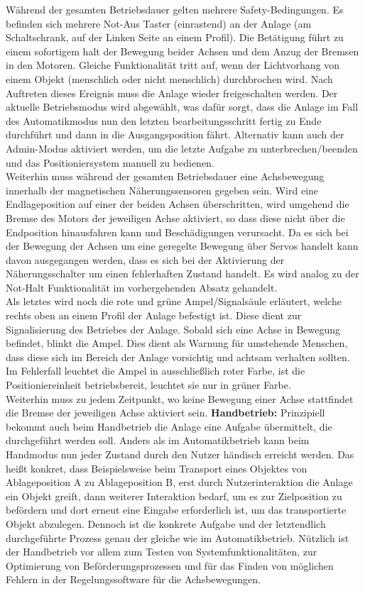\documentclass[../Bachelorarbeit.tex]{subfiles}
\begin{document}
Während der gesamten Betriebsdauer gelten mehrere Safety-Bedingungen. Es befinden sich mehrere Not-Aus Taster (einrastend) an der Anlage (am Schaltschrank, auf der Linken Seite an einem Profil). Die Betätigung führt zu einem sofortigem halt der Bewegung beider Achsen und dem Anzug der Bremsen in den Motoren. Gleiche Funktionalität tritt auf, wenn der Lichtvorhang von einem Objekt (menschlich oder nicht menschlich) durchbrochen wird. Nach Auftreten dieses Ereignis muss die Anlage wieder freigeschalten werden. Der aktuelle Betriebsmodus wird abgewählt, was dafür sorgt, dass die Anlage im Fall des Automatikmodus nun den letzten bearbeitungsschritt fertig zu Ende durchführt und dann in die Ausgangsposition fährt. Alternativ kann auch der Admin-Modus aktiviert werden, um die letzte Aufgabe zu unterbrechen/beenden und das Positioniersystem manuell zu bedienen.\\
Weiterhin muss während der gesamten Betriebsdauer eine Achsbewegung innerhalb der magnetischen Näherungssensoren gegeben sein. Wird eine Endlageposition auf einer der beiden Achsen überschritten, wird umgehend die Bremse des Motors der jeweiligen Achse aktiviert, so dass diese nicht über die Endposition hinausfahren kann und Beschädigungen verursacht. Da es sich bei der Bewegung der Achsen um eine geregelte Bewegung über Servos handelt kann davon ausgegangen werden, dass es sich bei der Aktivierung der Näherungsschalter um einen fehlerhaften Zustand handelt. Es wird analog zu der Not-Halt Funktionalität im vorhergehenden Absatz gehandelt.\\
Als letztes wird noch die rote und grüne Ampel/Signalsäule erläutert, welche rechts oben an einem Profil der Anlage befestigt ist. Diese dient zur Signalisierung des Betriebes der Anlage. Sobald sich eine Achse in Bewegung befindet, blinkt die Ampel. Dies dient als Warnung für umstehende Menschen, dass diese sich im Bereich der Anlage vorsichtig und achtsam verhalten sollten. Im Fehlerfall leuchtet die Ampel in ausschließlich roter Farbe, ist die Positioniereinheit betriebsbereit, leuchtet sie nur in grüner Farbe.\\
Weiterhin muss zu jedem Zeitpunkt, wo keine Bewegung einer Achse stattfindet die Bremse der jeweiligen Achse aktiviert sein.
\smallskip
\newline
\textbf{Handbetrieb:} Prinzipiell bekommt auch beim Handbetrieb die Anlage eine Aufgabe übermittelt, die durchgeführt werden soll. Anders als im Automatikbetrieb kann beim Handmodus nun jeder Zustand durch den Nutzer händisch erreicht werden. Das heißt konkret, dass Beispielsweise beim Transport eines Objektes von Ablageposition A zu Ablageposition B, erst durch Nutzerinteraktion die Anlage ein Objekt greift, dann weiterer Interaktion bedarf, um es zur Zielposition zu befördern und dort erneut eine Eingabe erforderlich ist, um das transportierte Objekt abzulegen. Dennoch ist die konkrete Aufgabe und der letztendlich durchgeführte Prozess genau der gleiche wie im Automatikbetrieb. Nützlich ist der Handbetrieb vor allem zum Testen von Systemfunktionalitäten, zur Optimierung von Beförderungsprozessen und für das Finden von möglichen Fehlern in der Regelungssoftware für die Achsbewegungen.\\
\end{document}
